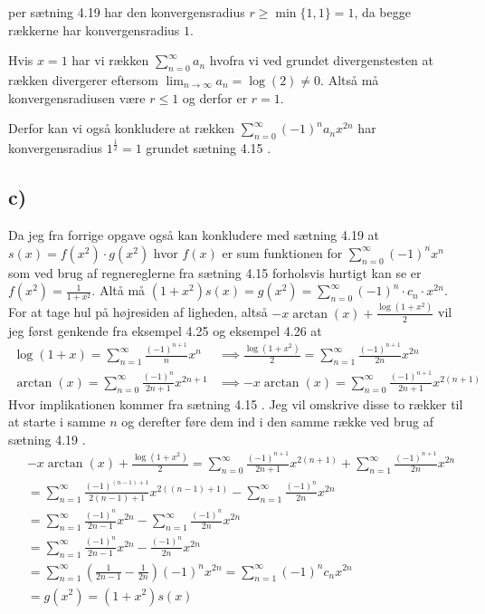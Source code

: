 \documentclass{article}
\newcommand{\lr}[1]{\left( #1\right)}
\begin{document}
per sætning 4.19 har den konvergensradius $r \ge \min\{1,1\} = 1$, da begge rækkerne har konvergensradius $1$.

Hvis $x = 1$ har vi rækken $\sum_{n=0}^{\infty} a_n$ hvofra vi ved grundet
divergenstesten \cite[sætning 2.2]{an1} at rækken divergerer eftersom $\lim_{n \to \infty} a_n = \log(2) \neq 0$.
Altså må konvergensradiusen være $r \le 1$ og derfor er $r=1$.

Derfor kan vi også konkludere at rækken $\sum_{n=0}^{\infty} (-1)^n a_n x^{2n}$ 
har konvergensradius $1^{\frac{1}{2}} = 1$ grundet sætning 4.15 \cite{an1}.

\subsection*{c)}
Da jeg fra forrige opgave også kan konkludere med sætning 4.19 at $s(x) = f(x^2) \cdot g(x^2)$
hvor $f(x)$ er sum funktionen for $\sum_{n=0}^{\infty} (-1)^n x^n$ som ved brug af regnereglerne fra sætning 4.15 \cite{an1}
forholsvis hurtigt kan se er $f(x^2) = \frac{1}{1+x^2}$.
Altå må $(1+x^2)s(x) = g(x^2) = \sum_{n=0}^{\infty} (-1)^n \cdot c_n \cdot  x^{2n}$.
For at tage hul på højresiden af ligheden, altså $-x \arctan(x) + \frac{\log(1+x^2)}{2}$ vil jeg først genkende 
fra eksempel 4.25 og eksempel 4.26 \cite{an1} at
\begin{align*}
    \log(1+x) = \sum_{n=1}^{\infty} \frac{(-1)^{n+1}}{n} x^n &\implies
    \frac{\log(1+x^2)}{2} = \sum_{n=1}^{\infty} \frac{(-1)^{n+1}}{2n} x^{2n} \\
    \arctan(x) = \sum_{n=0}^{\infty} \frac{(-1)^{n}}{2n+1} x^{2n+1} &\implies
    -x\arctan(x) = \sum_{n=0}^{\infty} \frac{(-1)^{n+1}}{2n+1} x^{2(n+1)}
\end{align*}
Hvor implikationen kommer fra sætning 4.15 \cite{an1}.
Jeg vil omskrive disse to rækker til at starte i samme $n$ og derefter føre 
dem ind i den samme række ved brug af sætning 4.19 \cite{an1}.
\begin{align*}
&-x\arctan(x) + \frac{\log(1+x^2)}{2} 
= \sum_{n=0}^{\infty} \frac{(-1)^{n+1}}{2n+1} x^{2(n+1)} + \sum_{n=1}^{\infty} \frac{(-1)^{n+1}}{2n} x^{2n} \\
&= \sum_{n=1}^{\infty} \frac{(-1)^{(n-1)+1}}{2(n-1)+1} x^{2((n-1)+1)} - \sum_{n=1}^{\infty} \frac{(-1)^{n}}{2n} x^{2n} \\
&= \sum_{n=1}^{\infty} \frac{(-1)^{n}}{2n-1} x^{2n} - \sum_{n=1}^{\infty} \frac{(-1)^{n}}{2n} x^{2n} \\
&= \sum_{n=1}^{\infty} \frac{(-1)^{n}}{2n-1} x^{2n} - \frac{(-1)^{n}}{2n} x^{2n} \\
&= \sum_{n=1}^{\infty} \lr{\frac{1}{2n-1} - \frac{1}{2n}} (-1)^{n} x^{2n} 
= \sum_{n=1}^{\infty} (-1)^{n} c_n x^{2n} \\
&= g(x^2) = (1 + x^2) s(x)
\end{align*}
\end{document}
